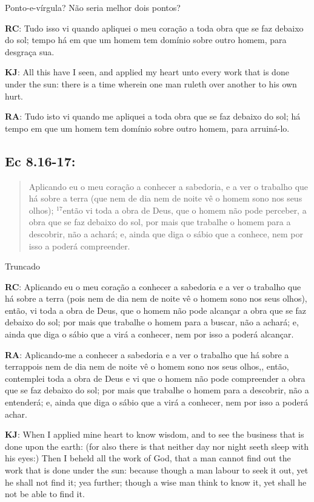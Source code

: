 Ponto-e-vírgula? Não seria melhor dois pontos?

\textbf{RC}: Tudo isso vi quando apliquei o meu coração a toda obra que se faz debaixo do sol; tempo há em que um homem tem domínio sobre outro homem, para desgraça sua.

\textbf{KJ}: All this have I seen, and applied my heart unto every work that is done under the sun: there is a time wherein one man ruleth over another to his own hurt.

\textbf{RA}: Tudo isto vi quando me apliquei a toda obra que se faz debaixo do sol; há tempo em que um homem tem domínio sobre outro homem, para arruiná-lo.

\subsection*{Ec 8.16-17:} 
 \begin{quote}
  \small
 Aplicando eu o meu coração a conhecer a sabedoria, e a ver o trabalho que há sobre a terra (que nem de dia nem de noite vê o homem sono nos seus olhos); $^{\mathrm{17}}$então vi toda a obra de Deus, que o homem não pode perceber, a obra que se faz debaixo do sol, por mais que trabalhe o homem para a descobrir, não a achará; e, ainda que diga o sábio que a conhece, nem por isso a poderá compreender.
 \end{quote}

Truncado

\textbf{RC}: Aplicando eu o meu coração a conhecer a sabedoria e a ver o trabalho que há sobre a terra (pois nem de dia nem de noite vê o homem sono nos seus olhos), então, vi toda a obra de Deus, que o homem não pode alcançar a obra que se faz debaixo do sol; por mais que trabalhe o homem para a buscar, não a achará; e, ainda que diga o sábio que a virá a conhecer, nem por isso a poderá alcançar.

\textbf{RA}: Aplicando-me a conhecer a sabedoria e a ver o trabalho que há sobre a terrappois nem de dia nem de noite vê o homem sono nos seus olhos,, então, contemplei toda a obra de Deus e vi que o homem não pode compreender a obra que se faz debaixo do sol; por mais que trabalhe o homem para a descobrir, não a entenderá; e, ainda que diga o sábio que a virá a conhecer, nem por isso a poderá achar.

\textbf{KJ}: When I applied mine heart to know wisdom, and to see the business that is done upon the earth: (for also there is that neither day nor night seeth sleep with his eyes:) Then I beheld all the work of God, that a man cannot find out the work that is done under the sun: because though a man labour to seek it out, yet he shall not find it; yea further; though a wise man think to know it, yet shall he not be able to find it.

